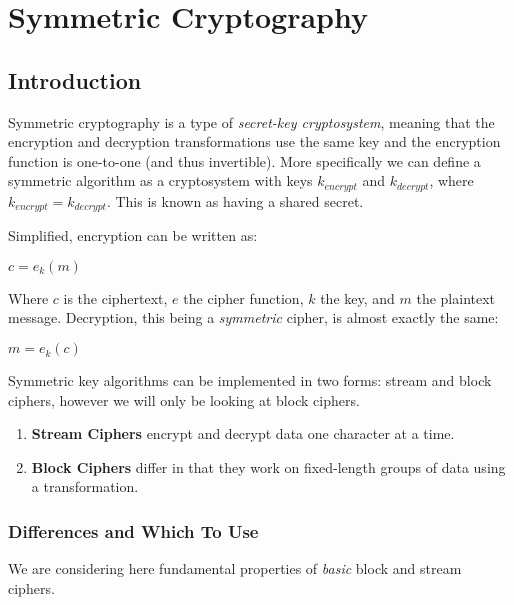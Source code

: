 
\chapter{Symmetric Cryptography}
\label{Chapter4}

\section{Introduction}

Symmetric cryptography is a type of \emph{secret-key cryptosystem}, meaning that the encryption and decryption transformations use the same key and the encryption function is one-to-one (and thus invertible). More specifically we can define a symmetric algorithm as a cryptosystem with keys $k_{encrypt}$ and $k_{decrypt}$, where $k_{encrypt} = k_{decrypt}$. This is known as having a shared secret.

Simplified, encryption can be written as:

\begin{center}
  $c = e_k(m)$
\end{center}

Where $c$ is the ciphertext, $e$ the cipher function, $k$ the key, and $m$ the plaintext message. Decryption, this being a \emph{symmetric} cipher, is almost exactly the same:

\begin{center}
  $m = e_k(c)$
\end{center}

Symmetric key algorithms can be implemented in two forms: stream and block ciphers, however we will only be looking at block ciphers. 

\begin{enumerate}
  \item \textbf{Stream Ciphers} encrypt and decrypt data one character at a time.
  \item \textbf{Block Ciphers} differ in that they work on fixed-length groups of data using a transformation.
\end{enumerate}

  \subsection{Differences and Which To Use}
  
  We are considering here fundamental properties of \emph{basic} block and stream ciphers.

